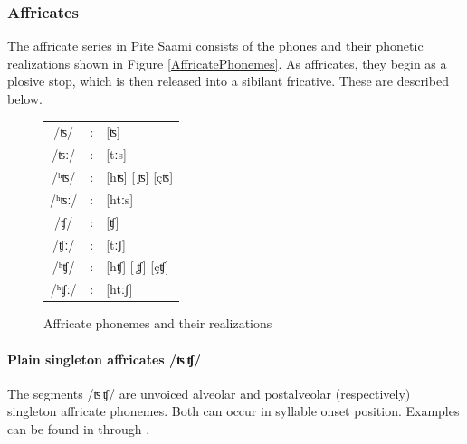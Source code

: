 \FB

\subsubsection{Affricates}\label{Affricates}
The affricate series in Pite Saami consists of the phones and their phonetic realizations shown in Figure \vref{AffricatePhonemes}. As affricates, they begin as a plosive stop, which is then released into a sibilant fricative. %
These are described below.
\begin{figure}\centering
\begin{tabular}{c c l}
/ʦ/ &:& [ʦ] \\ %
/ʦː/ &:& [tːs] \\ %
/ʰʦ/ &:& [hʦ] [ ̥ʦ] [çʦ] \\ %
/ʰʦː/ &:& [htːs] \\ %
/ʧ/ &:& [ʧ] \\ %
/ʧː/ &:& [tːʃ] \\ %
/ʰʧ/ &:& [hʧ] [ ̥ʧ] [çʧ]  \\ %
/ʰʧː/ &:& [htːʃ] \\ %
\end{tabular}
\caption{Affricate phonemes and their realizations}\label{AffricatePhonemes}
\end{figure}

\paragraph{Plain singleton affricates /ʦ\,ʧ/}\label{tstj}
The segments /ʦ\,ʧ/ are unvoiced alveolar and postalveolar (respectively) singleton affricate phonemes. Both can occur in syllable onset position. Examples can be found in  through .

